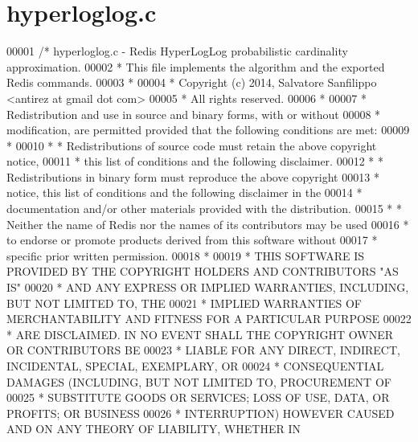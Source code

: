 \hypertarget{hyperloglog_8c_source}{}\section{hyperloglog.\+c}
\label{hyperloglog_8c_source}

\begin{DoxyCode}
00001 \textcolor{comment}{/* hyperloglog.c - Redis HyperLogLog probabilistic cardinality approximation.}
00002 \textcolor{comment}{ * This file implements the algorithm and the exported Redis commands.}
00003 \textcolor{comment}{ *}
00004 \textcolor{comment}{ * Copyright (c) 2014, Salvatore Sanfilippo <antirez at gmail dot com>}
00005 \textcolor{comment}{ * All rights reserved.}
00006 \textcolor{comment}{ *}
00007 \textcolor{comment}{ * Redistribution and use in source and binary forms, with or without}
00008 \textcolor{comment}{ * modification, are permitted provided that the following conditions are met:}
00009 \textcolor{comment}{ *}
00010 \textcolor{comment}{ *   * Redistributions of source code must retain the above copyright notice,}
00011 \textcolor{comment}{ *     this list of conditions and the following disclaimer.}
00012 \textcolor{comment}{ *   * Redistributions in binary form must reproduce the above copyright}
00013 \textcolor{comment}{ *     notice, this list of conditions and the following disclaimer in the}
00014 \textcolor{comment}{ *     documentation and/or other materials provided with the distribution.}
00015 \textcolor{comment}{ *   * Neither the name of Redis nor the names of its contributors may be used}
00016 \textcolor{comment}{ *     to endorse or promote products derived from this software without}
00017 \textcolor{comment}{ *     specific prior written permission.}
00018 \textcolor{comment}{ *}
00019 \textcolor{comment}{ * THIS SOFTWARE IS PROVIDED BY THE COPYRIGHT HOLDERS AND CONTRIBUTORS "AS IS"}
00020 \textcolor{comment}{ * AND ANY EXPRESS OR IMPLIED WARRANTIES, INCLUDING, BUT NOT LIMITED TO, THE}
00021 \textcolor{comment}{ * IMPLIED WARRANTIES OF MERCHANTABILITY AND FITNESS FOR A PARTICULAR PURPOSE}
00022 \textcolor{comment}{ * ARE DISCLAIMED. IN NO EVENT SHALL THE COPYRIGHT OWNER OR CONTRIBUTORS BE}
00023 \textcolor{comment}{ * LIABLE FOR ANY DIRECT, INDIRECT, INCIDENTAL, SPECIAL, EXEMPLARY, OR}
00024 \textcolor{comment}{ * CONSEQUENTIAL DAMAGES (INCLUDING, BUT NOT LIMITED TO, PROCUREMENT OF}
00025 \textcolor{comment}{ * SUBSTITUTE GOODS OR SERVICES; LOSS OF USE, DATA, OR PROFITS; OR BUSINESS}
00026 \textcolor{comment}{ * INTERRUPTION) HOWEVER CAUSED AND ON ANY THEORY OF LIABILITY, WHETHER IN}

\end{DoxyCode}
